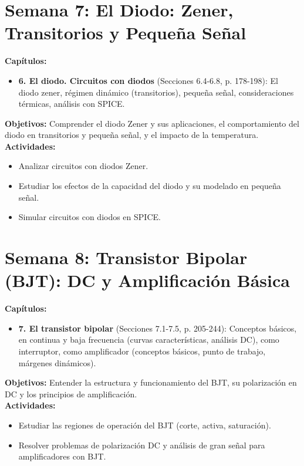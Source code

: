 \documentclass[12pt, a4paper]{article}
\begin{document}
\section{Semana 7: El Diodo: Zener, Transitorios y Pequeña Señal}
\textbf{Capítulos:}
\begin{itemize}
    \item \textbf{6. El diodo. Circuitos con diodos} (Secciones 6.4-6.8, p. 178-198): El diodo zener, régimen dinámico (transitorios), pequeña señal, consideraciones térmicas, análisis con SPICE.
\end{itemize}
\textbf{Objetivos:} Comprender el diodo Zener y sus aplicaciones, el comportamiento del diodo en transitorios y pequeña señal, y el impacto de la temperatura.\\
\textbf{Actividades:}
\begin{itemize}
    \item Analizar circuitos con diodos Zener.
    \item Estudiar los efectos de la capacidad del diodo y su modelado en pequeña señal.
    \item Simular circuitos con diodos en SPICE.
\end{itemize}

\section{Semana 8: Transistor Bipolar (BJT): DC y Amplificación Básica}
\textbf{Capítulos:}
\begin{itemize}
    \item \textbf{7. El transistor bipolar} (Secciones 7.1-7.5, p. 205-244): Conceptos básicos, en continua y baja frecuencia (curvas características, análisis DC), como interruptor, como amplificador (conceptos básicos, punto de trabajo, márgenes dinámicos).
\end{itemize}
\textbf{Objetivos:} Entender la estructura y funcionamiento del BJT, su polarización en DC y los principios de amplificación.\\
\textbf{Actividades:}
\begin{itemize}
    \item Estudiar las regiones de operación del BJT (corte, activa, saturación).
    \item Resolver problemas de polarización DC y análisis de gran señal para amplificadores con BJT.
\end{itemize}
\end{document}
